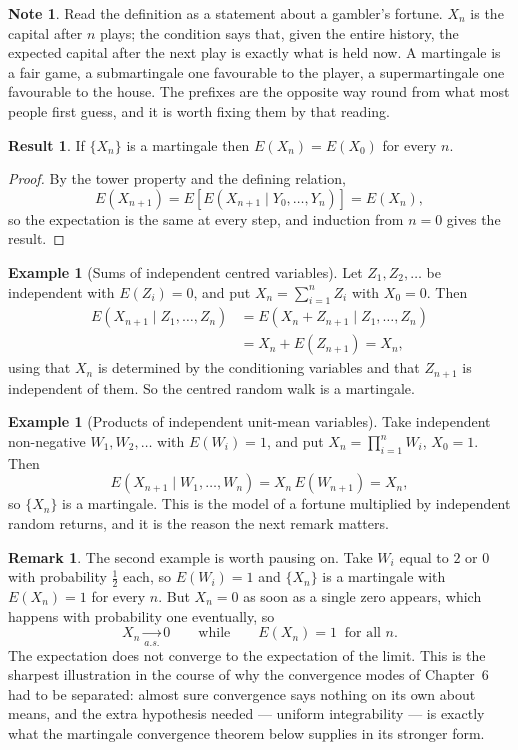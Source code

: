 \documentclass[11pt,a4paper]{article}
\theoremstyle{definition}
\newtheorem{exa}[thm]{Example}
\newtheorem{result}[thm]{Result}
\newtheorem*{note}{Note}
\newtheorem*{remark}{Remark}
\begin{document}
\begin{note}
Read the definition as a statement about a gambler's fortune. $X_n$ is the
capital after $n$ plays; the condition says that, given the entire history, the
expected capital after the next play is exactly what is held now. A martingale
is a fair game, a submartingale one favourable to the player, a supermartingale
one favourable to the house. The prefixes are the opposite way round from what
most people first guess, and it is worth fixing them by that reading.
\end{note}

\begin{result}
If $\{X_n\}$ is a martingale then $E(X_n) = E(X_0)$ for every $n$.
\end{result}

\begin{proof}
By the tower property and the defining relation,
$$E\left(X_{n+1}\right) = E\left[E\left(X_{n+1}\mid Y_0,\dots,Y_n\right)\right]
= E\left(X_n\right),$$
so the expectation is the same at every step, and induction from $n=0$ gives the
result.
\end{proof}

\begin{exa}[Sums of independent centred variables]
Let $Z_1,Z_2,\dots$ be independent with $E(Z_i)=0$, and put
$X_n = \sum_{i=1}^{n}Z_i$ with $X_0=0$. Then
\begin{align*}
E\left(X_{n+1}\mid Z_1,\dots,Z_n\right)
&= E\left(X_n + Z_{n+1}\mid Z_1,\dots,Z_n\right)\\
&= X_n + E\left(Z_{n+1}\right) = X_n ,
\end{align*}
using that $X_n$ is determined by the conditioning variables and that
$Z_{n+1}$ is independent of them. So the centred random walk is a martingale.
\end{exa}

\begin{exa}[Products of independent unit-mean variables]
Take independent non-negative $W_1,W_2,\dots$ with $E(W_i)=1$, and put
$X_n = \prod_{i=1}^{n}W_i$, $X_0=1$. Then
$$E\left(X_{n+1}\mid W_1,\dots,W_n\right) = X_n\,E\left(W_{n+1}\right) = X_n ,$$
so $\{X_n\}$ is a martingale. This is the model of a fortune multiplied by
independent random returns, and it is the reason the next remark matters.
\end{exa}

\begin{remark}
The second example is worth pausing on. Take $W_i$ equal to $2$ or $0$ with
probability $\tfrac12$ each, so $E(W_i)=1$ and $\{X_n\}$ is a martingale with
$E(X_n)=1$ for every $n$. But $X_n=0$ as soon as a single zero appears, which
happens with probability one eventually, so
$$X_n \underset{a.s.}{\longrightarrow} 0 \qquad\text{while}\qquad E(X_n)=1
\ \text{ for all } n .$$
The expectation does not converge to the expectation of the limit. This is the
sharpest illustration in the course of why the convergence modes of Chapter~6
had to be separated: almost sure convergence says nothing on its own about
means, and the extra hypothesis needed --- uniform integrability --- is exactly
what the martingale convergence theorem below supplies in its stronger form.
\end{remark}
\end{document}

